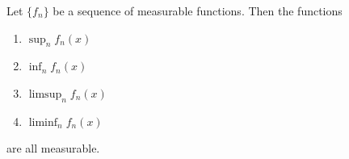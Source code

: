 Let $\{f_n\}$ be a sequence of measurable functions. Then the functions
\begin{enumerate}
\item[(1)] $\sup_n f_n(x)$
\item[(2)] $\inf_n f_n(x)$
\item[(3)] $\limsup_n f_n(x)$
\item[(4)] $\liminf_n f_n(x)$
\end{enumerate}
are all measurable.
